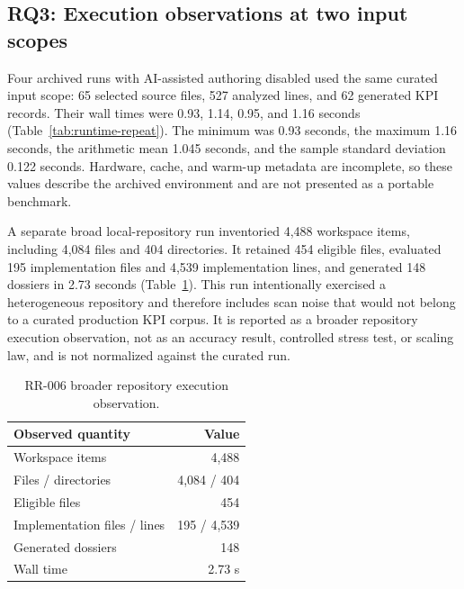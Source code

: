 \documentclass[a4paper,fleqn]{cas-dc}
\begin{document}
\subsection{RQ3: Execution observations at two input scopes}

Four archived runs with AI-assisted authoring disabled used the same curated input scope: 65 selected source files, 527 analyzed lines, and 62 generated KPI records. Their wall times were 0.93, 1.14, 0.95, and 1.16 seconds (Table~\ref{tab:runtime-repeat}). The minimum was 0.93 seconds, the maximum 1.16 seconds, the arithmetic mean 1.045 seconds, and the sample standard deviation 0.122 seconds. Hardware, cache, and warm-up metadata are incomplete, so these values describe the archived environment and are not presented as a portable benchmark.

\begin{table}[!t]
\centering
\caption{Repeated executions in RR-004; RR-005 summarizes these same four runs.}
\label{tab:runtime-repeat}
\end{table}

A separate broad local-repository run inventoried 4,488 workspace items, including 4,084 files and 404 directories. It retained 454 eligible files, evaluated 195 implementation files and 4,539 implementation lines, and generated 148 dossiers in 2.73 seconds (Table~\ref{tab:runtime-broad}). This run intentionally exercised a heterogeneous repository and therefore includes scan noise that would not belong to a curated production KPI corpus. It is reported as a broader repository execution observation, not as an accuracy result, controlled stress test, or scaling law, and is not normalized against the curated run.

\begin{table}[!t]
\centering
\caption{RR-006 broader repository execution observation.}
\label{tab:runtime-broad}
\begin{tabular}{lr}
\toprule
\textbf{Observed quantity} & \textbf{Value}\\
\midrule
Workspace items & 4,488\\
Files / directories & 4,084 / 404\\
Eligible files & 454\\
Implementation files / lines & 195 / 4,539\\
Generated dossiers & 148\\
Wall time & 2.73 s\\
\bottomrule
\end{tabular}
\end{table}
\end{document}
